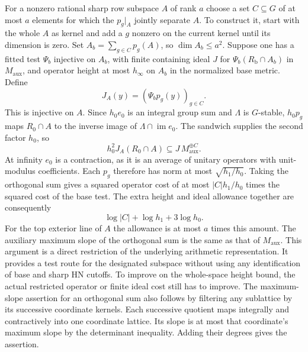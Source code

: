 For a nonzero rational sharp row subspace \(A\) of rank \(a\)
choose a set \(C\subseteq G\) of at most \(a\) elements for which the
\(p_g|_A\) jointly separate \(A\). To construct it, start with the
whole \(A\) as kernel and add a \(g\) nonzero on the current
kernel until its dimension is zero. Set
\(A_b=\sum_{g\in C}p_g(A)\), so \(\dim A_b\le a^2\).
Suppose one has a fitted test \(\Psi_b\) injective on \(A_b\), with
finite containing ideal \(J\) for \(\Psi_b(R_{\mathrm b}\cap A_b)\)
in \(M_{\mathrm{aux}}\), and operator height at most \(h_\infty\)
on \(A_b\) in the normalized base metric. Define
\[
          J_A(y)=(\Psi_b p_g(y))_{g\in C}.
\]
This is injective on \(A\). Since \(h_0e_0\) is an integral group sum and \(\Lambda\) is \(G\)-stable,
\(h_0p_g\) maps \(R_0\cap A\) to the inverse image of
\(\Lambda\cap\operatorname{im}e_0\). The sandwich supplies the
second factor \(h_0\), so
\[
 h_0^2J_A(R_0\cap A)\subseteq
                  J\,M_{\mathrm{aux}}^{\oplus C}.
\]
At infinity \(e_0\) is a contraction, as it is an average of
unitary operators with unit-modulus coefficients. Each \(p_g\)
therefore has norm at most \(\sqrt{h_1/h_0}\). Taking the orthogonal
sum gives a squared operator cost of at most \(|C|h_1/h_0\) times
the squared cost of the base test. The extra height and ideal
allowance together are consequently
\[
       \log|C|+\log h_1+3\log h_0.
\]
For the top exterior line of \(A\) the allowance is at most \(a\)
times this amount. The auxiliary maximum slope of the orthogonal
sum is the same as that of \(M_{\mathrm{aux}}\).
This argument is a direct restriction of the underlying arithmetic
representation. It provides a test route for the designated
subspace without using any identification of base and sharp HN
cutoffs. To improve on the whole-space height bound, the actual
restricted operator or finite ideal cost still has to improve.
The maximum-slope assertion for an orthogonal sum also follows
by filtering any sublattice by its successive coordinate kernels.
Each successive quotient maps integrally and contractively into
one coordinate lattice. Its slope is at most that coordinate's
maximum slope by the determinant inequality. Adding their
degrees gives the assertion.

